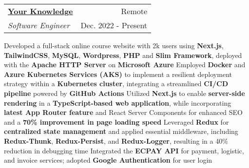 \newcommand{\resumeExpEntry}[4]{
  \vspace{5pt}\item
    \begin{tabular*}{0.97\textwidth}{l@{\extracolsep{\fill}}r}
      \textbf{#1} & \small #2 \\
      \textit{#3} & \small #4 \\
    \end{tabular*}\vspace{-5pt}
}

\resumeExpEntry
{\href{https://yourknowledge.online}{Your Knowledge}}
{Remote}
{Software Engineer}
{Dec. 2022 - Present}
{
  \resumeItemListStart
    \resumeItem
    {Developed a full-stack online course website with 2k users using \textbf{Next.js}, \textbf{TailwindCSS}, \textbf{MySQL}, \textbf{Wordpress}, \textbf{PHP} and \textbf{Slim Framework}, deployed with the \textbf{Apache HTTP Server} on \textbf{Microsoft Azure}}
    \resumeItem
    {Employed \textbf{Docker} and \textbf{Azure Kubernetes Services (AKS)} to implement a resilient deployment strategy within a \textbf{Kubernetes cluster}, integrating a streamlined \textbf{CI/CD pipeline} powered by \textbf{GitHub Actions}}
    \resumeItem
    {Utilized \textbf{Next.js} to enable \textbf{server-side rendering} in a \textbf{TypeScript-based web application}, while incorporating \textbf{latest App Router feature} and React Server Components for enhanced SEO and a \textbf{70\% improvement in page loading speed}}
    \resumeItem
    {Leveraged \textbf{Redux} for \textbf{centralized state management} and applied essential middleware, including \textbf{Redux-Thunk}, \textbf{Redux-Persist}, and \textbf{Redux-Logger}, resulting in a 40\% reduction in debugging time}
    \resumeItem
    {Integrated the \textbf{ECPAY API} for payment, logistic, and invoice services; adopted \textbf{Google Authentication} for user login}
  \resumeItemListEnd
}

